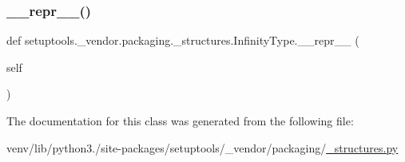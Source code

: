 \subsubsection{\texorpdfstring{\+\_\+\+\_\+repr\+\_\+\+\_\+()}{\_\_repr\_\_()}}
{\footnotesize\ttfamily def setuptools.\+\_\+vendor.\+packaging.\+\_\+structures.\+Infinity\+Type.\+\_\+\+\_\+repr\+\_\+\+\_\+ (\begin{DoxyParamCaption}\item[{}]{self }\end{DoxyParamCaption})}



The documentation for this class was generated from the following file\+:\begin{DoxyCompactItemize}
\item 
venv/lib/python3./site-\/packages/setuptools/\+\_\+vendor/packaging/\hyperlink{setuptools_2__vendor_2packaging_2__structures_8py}{\+\_\+structures.\+py}\end{DoxyCompactItemize}
